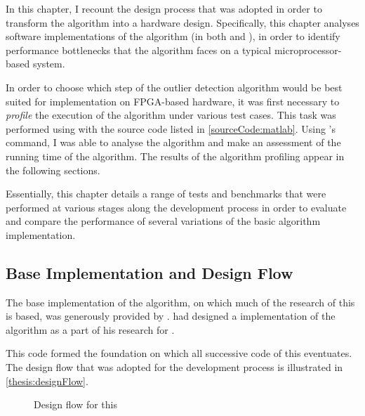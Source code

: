 In this chapter, I recount the design process that was adopted in order to
transform the  algorithm into a
hardware design. Specifically, this chapter analyses software implementations of
the algorithm (in both  and ), in order to identify
performance bottlenecks that the algorithm faces on a typical
microprocessor-based system.

In order to choose which step of the outlier detection algorithm would be best
suited for implementation on \gls{FPGA}-based hardware, it was first necessary
to \emph{profile} the execution of the algorithm under various test cases. This
task was performed using  with the source code listed in
\autoref{sourceCode:matlab}. Using 's 
command, I was able to analyse the algorithm and make an assessment of the
running time of the algorithm. The results of the algorithm profiling appear in
the following sections.

Essentially, this chapter details a range of tests and benchmarks that were
performed at various stages along the development process in order to evaluate
and compare the performance of several variations of the basic algorithm
implementation.

\subsection{Base Implementation and Design Flow}
\label{software:baseImplementation}
The base implementation of the 
algorithm, on which much of the research of this \thesis{} is based, was
generously provided by . \citeauthor{Khoa:2012} had designed a
 implementation of the algorithm as a part of his research for
 \cite{Khoa:2012}.

This  code formed the foundation on which all successive code
of this \thesis{} eventuates. The design flow that was adopted for the
development process is illustrated in \autoref{thesis:designFlow}.

\begin{figure}
    \centering
    
    \caption{Design flow for this \thesis{}}
    \label{thesis:designFlow}
\end{figure}

